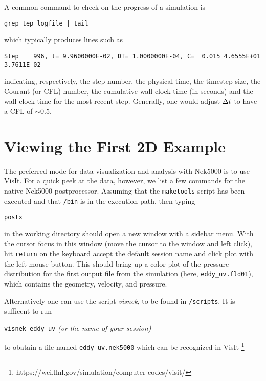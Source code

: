 A common command to check on the progress of a simulation is
\begin{verbatim}
grep tep logfile | tail
\end{verbatim}
which typically produces lines such as
\scriptsize
\begin{verbatim}
Step    996, t= 9.9600000E-02, DT= 1.0000000E-04, C=  0.015 4.6555E+01 3.7611E-02
\end{verbatim}
\normalsize
indicating, respectively, the step number, the physical time, the
timestep size, the Courant (or CFL) number, the cumulative wall clock time (in seconds)
and the wall-clock time for the most recent step.   Generally, one would 
adjust $\Delta t$ to have a CFL of $\sim$0.5.  



\section{Viewing the First 2D Example}

The preferred mode for data visualization and analysis with Nek5000 is
to use VisIt.  For a quick
peek at the data, however, we list a few commands for the native Nek5000 
postprocessor.   Assuming that the {\tt maketools} script has been executed
and that {\tt /bin} is in the execution path, then typing 

\noindent
{\tt postx} 

\noindent
in the working directory should open a new window with a sidebar menu.
With the cursor focus in this window (move the cursor to the window and
left click), hit {\tt return} on the keyboard accept the default session name and click {\sc plot} with the left mouse button.  This should bring up
a color plot of the pressure distribution for the first output file
from the simulation (here, {\tt eddy\_uv.fld01}), which contains the
geometry, velocity, and pressure.  

Alternatively one can use the script \textit{visnek}, to be found in {\tt /scripts}. It is sufficent to run 

\noindent
{\tt visnek eddy\_uv}\textit{ (or the name of your session)}

to obatain a file named {\tt eddy\_uv.nek5000} which can be recognized in VisIt \footnote{https://wci.llnl.gov/simulation/computer-codes/visit/}


\begin{comment}
To see the vorticity at the final time, load the last output file,
{\tt eddy\_uv.fld12}, by clicking/typing the following in the postx window:
\begin{tabular}{r l l l}
  & {\bf click} \hspace*{1in} &{\bf type} \hspace*{1in} & {\bf comment} \\ \hline
1.& SET TIME         & 12 & load fld12 \\
2.& SET QUANTITY \\
3.& VORTICITY \\
4.& PLOT 
\end{tabular}
\end{comment}

